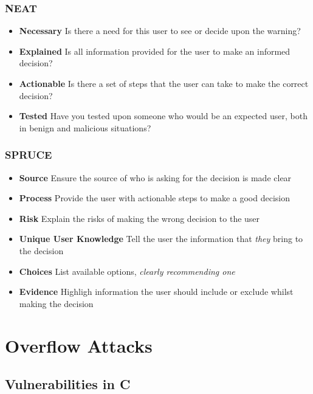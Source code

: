 \documentclass{article}
\begin{document}
\filbreak
\subsubsection{NEAT}

\begin{itemize}
\item \textbf{Necessary}
  \subitem
  Is there a need for this user to see or decide upon the warning?
\item \textbf{Explained}
  \subitem
  Is all information provided for the user to make an informed decision?
\item \textbf{Actionable}
  \subitem
  Is there a set of steps that the user can take to make the correct decision?
\item \textbf{Tested}
  \subitem
  Have you tested upon someone who would be an expected user, both in benign and malicious situations?
\end{itemize}

\subsubsection{SPRUCE}

\begin{itemize}
\item \textbf{Source}
  \subitem
  Ensure the source of who is asking for the decision is made clear
\item \textbf{Process}
  \subitem
  Provide the user with actionable steps to make a good decision
\item \textbf{Risk}
  \subitem
  Explain the risks of making the wrong decision to the user
\item \textbf{Unique User Knowledge}
  \subitem
  Tell the user the information that \textit{they} bring to the decision
\item \textbf{Choices}
  \subitem
  List available options, \textit{clearly recommending one}
\item \textbf{Evidence}
  \subitem
  Highligh information the user should include or exclude whilst making the decision
\end{itemize}

\section{Overflow Attacks}

\subsection{Vulnerabilities in C}
\end{document}
